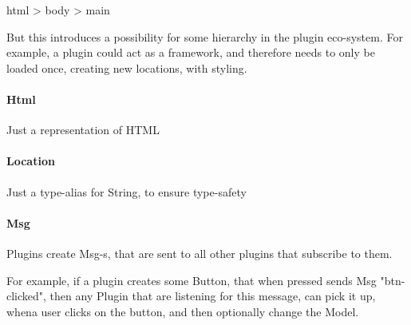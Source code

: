 html > body > main

But this introduces a possibility for some hierarchy in the plugin eco-system. For example,
a plugin could act as a framework, and therefore needs to only be loaded once, creating new locations, with styling.


\paragraph{Html}
Just a representation of HTML


\paragraph{Location}
Just a type-alias for String, to ensure type-safety


\paragraph{Msg}
Plugins create Msg-s, that are sent to all other plugins that subscribe to them.

For example, if a plugin creates some Button, that when pressed sends Msg "btn-clicked", then any Plugin that are
listening for this message, can pick it up, whena user clicks on the button, and then optionally change the Model.


